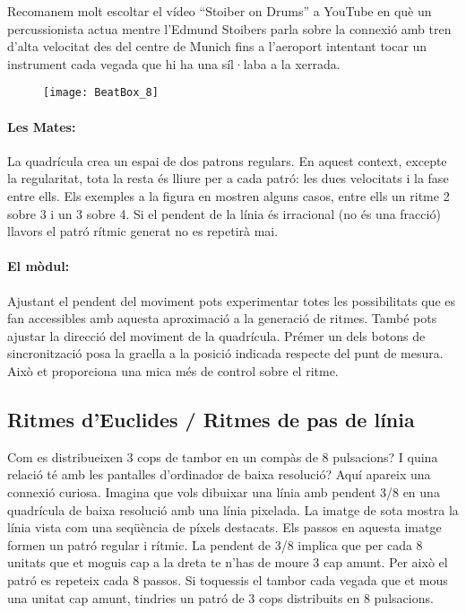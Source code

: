Recomanem molt escoltar el vídeo ``Stoiber on Drums'' a YouTube en què un percussionista actua mentre
l'Edmund Stoibers parla sobre la connexió amb tren d'alta velocitat des del centre de Munich fins a l'aeroport intentant tocar un instrument cada vegada que hi ha una síl·laba a la xerrada.

\begin{figure}[h]
\centering
\texttt{[image: BeatBox\_8]}
\end{figure}

\paragraph{Les Mates:} La quadrícula crea un espai de dos patrons regulars. En aquest context, excepte la regularitat, tota la resta és lliure per a cada patró: les dues velocitats i la fase entre ells. Els exemples a la figura en mostren alguns casos, entre ells un ritme 2 sobre 3 i un 3 sobre 4. Si el pendent de la línia és irracional (no és una fracció) llavors el patró rítmic generat no es repetirà mai.

\paragraph{El mòdul:}
Ajustant el pendent del moviment pots experimentar totes les possibilitats que es fan accessibles amb aquesta aproximació a la generació de ritmes. També pots ajustar la direcció del moviment de la quadrícula. Prémer un dels botons de sincronització posa la graella a la posició indicada respecte del punt de mesura. Això et proporciona una mica més de control sobre el ritme.

\subsection{Ritmes d'Euclides / Ritmes de pas de línia}
Com es distribueixen 3 cops de tambor en un compàs de 8 pulsacions? I quina relació té amb les pantalles d'ordinador de baixa resolució? Aquí apareix una connexió curiosa. Imagina que vols dibuixar una línia amb pendent 3/8 en una quadrícula de baixa resolució amb una línia pixelada. La imatge de sota mostra la línia vista com una seqüència de píxels destacats. Els passos en aquesta imatge formen un patró regular i rítmic. La pendent de 3/8 implica que per cada 8 unitats que et moguis cap a la dreta te n'has de moure 3 cap amunt. Per això el patró es repeteix cada 8 passos. Si toquessis el tambor cada vegada que et mous una unitat cap amunt, tindries un patró de 3 cops distribuits en 8 pulsacions.

